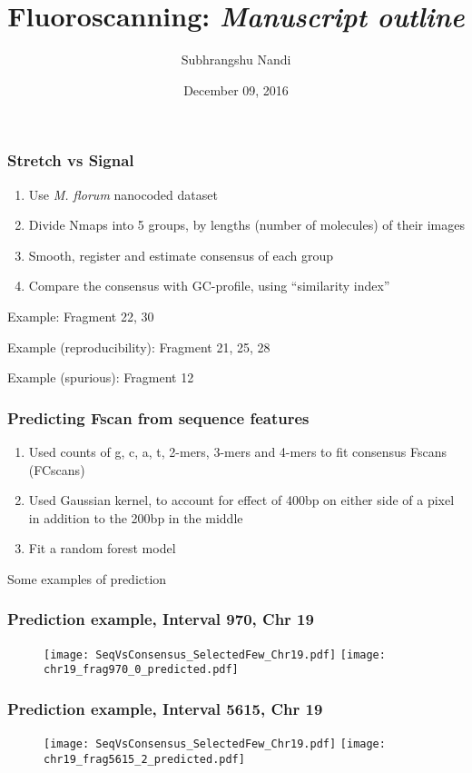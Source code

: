 \documentclass[10pt,dvipsnames,table]{beamer}
\title[Fluoroscanning]{Fluoroscanning: {\emph{Manuscript outline}}}
\author[S. Nandi]{Subhrangshu Nandi}
\date{December 09, 2016}
\begin{document}
\setlength{\baselineskip}{16truept}
\frame{\maketitle}

\begin{frame}
\frametitle{Stretch vs Signal}
\begin{enumerate}
\item Use {\emph{M. florum}} nanocoded dataset
\item Divide Nmaps into 5 groups, by lengths (number of molecules) of their images
\item Smooth, register and estimate consensus of each group
\item Compare the consensus with GC-profile, using ``similarity index''
\end{enumerate}

\vspace{1cm}

Example: Fragment 22, 30

Example (reproducibility): Fragment 21, 25, 28 

Example (spurious): Fragment 12
\end{frame}

\begin{frame}
\frametitle{Predicting Fscan from sequence features}
\begin{enumerate}
\item Used counts of g, c, a, t, 2-mers, 3-mers and 4-mers to fit consensus Fscans (FCscans)
\item Used Gaussian kernel, to account for effect of 400bp on either side of a pixel in addition to the 200bp in the middle
\item Fit a random forest model
\end{enumerate}
\vspace{2cm}
Some examples of prediction
\end{frame}

\begin{frame}
\frametitle{Prediction example, Interval 970, Chr 19}
\begin{figure}
\texttt{[image: SeqVsConsensus\_SelectedFew\_Chr19.pdf]}
\pause
\texttt{[image: chr19\_frag970\_0\_predicted.pdf]}
\end{figure}
\end{frame}

\begin{frame}
\frametitle{Prediction example, Interval 5615, Chr 19}
\begin{figure}
\texttt{[image: SeqVsConsensus\_SelectedFew\_Chr19.pdf]}
\pause
\texttt{[image: chr19\_frag5615\_2\_predicted.pdf]}
\end{figure}
\end{frame}
\end{document}
